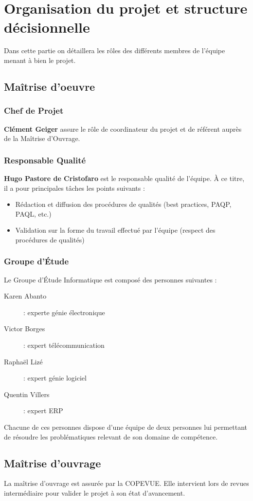 \section{Organisation du projet et structure décisionnelle}

Dans cette partie on détaillera les rôles des différents membres de l'équipe
menant à bien le projet.


\subsection{Maîtrise d'oeuvre}
\subsubsection{Chef de Projet}

\textbf{Clément Geiger} assure le rôle de coordinateur du projet et de référent auprès 
de la Maîtrise d'Ouvrage.


\subsubsection{Responsable Qualité}

\textbf{Hugo Pastore de Cristofaro} est le responsable qualité de l'équipe. À ce
titre, il a pour principales tâches les points suivants :
\begin{itemize}
\item Rédaction et diffusion des procédures de qualités (best practices,
PAQP, PAQL, etc.)
\item Validation sur la forme du travail effectué par l'équipe (respect des
procédures de qualités)
\end{itemize}


\subsubsection{Groupe d'Étude}

Le Groupe d'Étude Informatique est composé des personnes suivantes :

\begin{description}
\item [Karen Abanto] : experte génie électronique
\item [Victor Borges] : expert télécommunication
\item [Raphaël Lizé] : expert génie logiciel
\item [Quentin Villers] : expert ERP
\end{description}

Chacune de ces personnes dispose d'une équipe de deux personnes lui permettant de résoudre 
les problématiques relevant de son domaine de compétence.

\subsection{Maîtrise d'ouvrage}

La maîtrise d'ouvrage est assurée par la COPEVUE. Elle intervient lors de
revues intermédiaire pour valider le projet à son état d'avancement.
